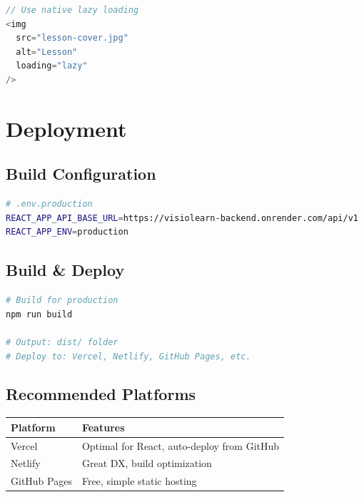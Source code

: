 \documentclass[12pt,a4paper,oneside]{article}
\begin{document}
\begin{lstlisting}[language=javascript]
// Use native lazy loading
<img 
  src="lesson-cover.jpg" 
  alt="Lesson" 
  loading="lazy" 
/>
\end{lstlisting}

\section{Deployment}

\subsection{Build Configuration}

\begin{lstlisting}[language=bash]
# .env.production
REACT_APP_API_BASE_URL=https://visiolearn-backend.onrender.com/api/v1
REACT_APP_ENV=production
\end{lstlisting}

\subsection{Build & Deploy}

\begin{lstlisting}[language=bash]
# Build for production
npm run build

# Output: dist/ folder
# Deploy to: Vercel, Netlify, GitHub Pages, etc.
\end{lstlisting}

\subsection{Recommended Platforms}

\begin{table}[H]
\centering
\small
\begin{tabular}{|l|l|}
\hline
\textbf{Platform} & \textbf{Features} \\
\hline
Vercel & Optimal for React, auto-deploy from GitHub \\
Netlify & Great DX, build optimization \\
GitHub Pages & Free, simple static hosting \\
\hline
\end{tabular}
\end{table}
\end{document}
